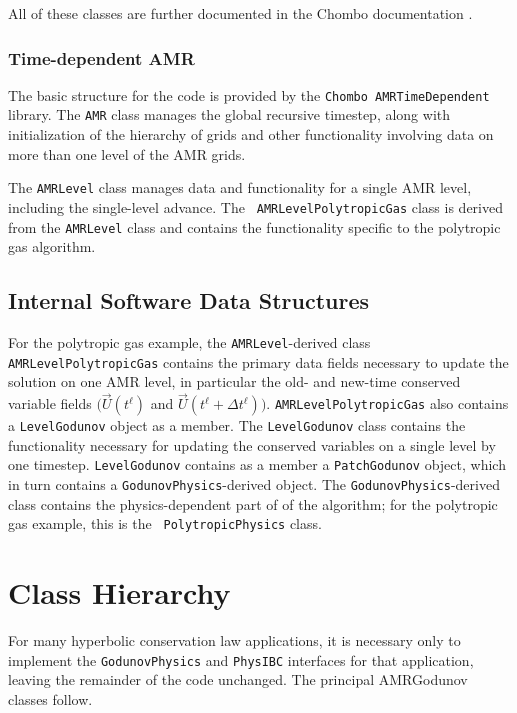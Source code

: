 All of these classes are further documented in the Chombo
documentation \cite{ChomboDesign}.

\subsubsection{Time-dependent AMR}
The basic structure for the code is provided by the {\tt Chombo
AMRTimeDependent} library.  The {\tt AMR} class manages the
global recursive timestep, along with initialization of the hierarchy of
grids and other functionality involving data on more than one level of
the AMR grids.

The {\tt AMRLevel} class manages data and functionality for a single
AMR level, including the single-level advance.  The {\tt
AMRLevelPolytropicGas} class is derived from the {\tt AMRLevel} class and 
contains the functionality specific to the polytropic gas algorithm.  


\subsection{Internal Software Data Structures}
For the polytropic gas example, the {\tt AMRLevel}-derived class
{\tt AMRLevelPolytropicGas} contains the primary data fields necessary to
update the solution on one AMR level, in particular the old- and
new-time conserved variable fields $(\vec{U}(t^\ell)$ and
$\vec{U}(t^\ell  + \Delta t^\ell))$. 
{\tt AMRLevelPolytropicGas} also contains a {\tt LevelGodunov} object as a
member.
The {\tt LevelGodunov} class contains the functionality necessary for
updating the conserved variables on a single level by one timestep.
{\tt LevelGodunov} contains as a member a {\tt PatchGodunov} object,
which in turn contains a {\tt GodunovPhysics}-derived object.
The {\tt GodunovPhysics}-derived class contains the physics-dependent part
of of the algorithm; for the polytropic gas example, this is the {\tt
PolytropicPhysics} class.

\section{Class Hierarchy}

For many hyperbolic conservation law applications, it is
necessary only to implement the {\tt GodunovPhysics} and {\tt PhysIBC}
interfaces for that application, leaving the remainder of the code unchanged.  
The principal AMRGodunov classes follow.

